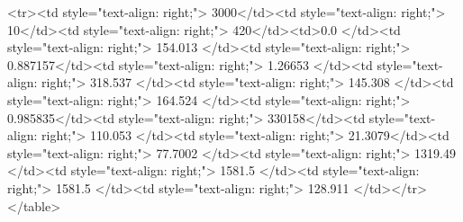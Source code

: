 <tr><td style="text-align: right;">      3000</td><td style="text-align: right;">        10</td><td style="text-align: right;">           420</td><td>0.0          </td><td style="text-align: right;">               154.013 </td><td style="text-align: right;">           0.887157</td><td style="text-align: right;">         1.26653 </td><td style="text-align: right;">        318.537 </td><td style="text-align: right;">           145.308 </td><td style="text-align: right;">             164.524   </td><td style="text-align: right;">             0.985835</td><td style="text-align: right;">              330158</td><td style="text-align: right;">                      110.053 </td><td style="text-align: right;">            21.3079</td><td style="text-align: right;">                77.7002 </td><td style="text-align: right;">      1319.49  </td><td style="text-align: right;">   1581.5  </td><td style="text-align: right;">      1581.5  </td><td style="text-align: right;">                128.911 </td></tr>
</table>